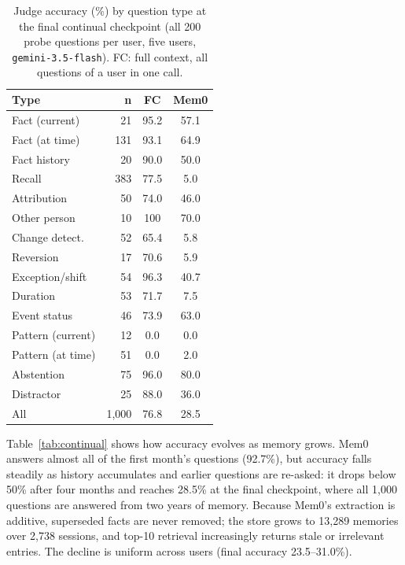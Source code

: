 \documentclass[11pt]{article}
\begin{document}
\begin{table}[t]
  \centering
  \small
  \setlength{\tabcolsep}{4pt}
  \begin{tabular}{lrcc}
    \toprule
    \textbf{Type} & \textbf{n} & \textbf{FC} & \textbf{Mem0} \\
    \midrule
    Fact (current)    & 21  & 95.2 & 57.1 \\
    Fact (at time)    & 131 & 93.1 & 64.9 \\
    Fact history      & 20  & 90.0 & 50.0 \\
    Recall            & 383 & 77.5 & 5.0 \\
    Attribution       & 50  & 74.0 & 46.0 \\
    Other person      & 10  & 100  & 70.0 \\
    Change detect.    & 52  & 65.4 & 5.8 \\
    Reversion         & 17  & 70.6 & 5.9 \\
    Exception/shift   & 54  & 96.3 & 40.7 \\
    Duration          & 53  & 71.7 & 7.5 \\
    Event status      & 46  & 73.9 & 63.0 \\
    Pattern (current) & 12  & 0.0  & 0.0 \\
    Pattern (at time) & 51  & 0.0  & 2.0 \\
    Abstention        & 75  & 96.0 & 80.0 \\
    Distractor        & 25  & 88.0 & 36.0 \\
    \midrule
    All               & 1{,}000 & 76.8 & 28.5 \\
    \bottomrule
  \end{tabular}
  \caption{Judge accuracy (\%) by question type at the final continual checkpoint (all 200 probe questions per user, five users, \texttt{gemini-3.5-flash}). FC: full context, all questions of a user in one call.}
  \label{tab:continual-type}
\end{table}

Table~\ref{tab:continual} shows how accuracy evolves as memory grows. Mem0 answers almost all of the first month's questions (92.7\%), but accuracy falls steadily as history accumulates and earlier questions are re-asked: it drops below 50\% after four months and reaches 28.5\% at the final checkpoint, where all 1{,}000 questions are answered from two years of memory. Because Mem0's extraction is additive, superseded facts are never removed; the store grows to 13{,}289 memories over 2{,}738 sessions, and top-10 retrieval increasingly returns stale or irrelevant entries. The decline is uniform across users (final accuracy 23.5--31.0\%).
\end{document}
